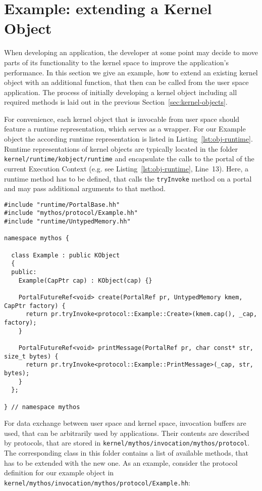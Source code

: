 \section{Example: extending a Kernel Object}
\label{sec:objects-example}

When developing an application, the developer at some point may decide to move
parts of its functionality to the kernel space to improve the application's
performance. In this section we give an example, how to extend an existing
kernel object with an additional function, that then can be called from the user space
application. The process of initially developing a kernel object including all
required methods is laid out in the previous Section~\ref{sec:kernel-objects}.

For convenience, each kernel object that is invocable from user space should
feature a runtime representation, which serves as a wrapper.  For our Example
object the according runtime representation is listed in
Listing~\ref{lst:obj-runtime}. Runtime representations of kernel objects are
typically located in the folder \texttt{kernel/runtime/kobject/runtime} and
encapsulate the calls to the portal of the current Execution Context (e.g. see
Listing~\ref{lst:obj-runtime}, Line~13). Here, a runtime method has to be
defined, that calls the \texttt{tryInvoke} method on a portal and may pass
additional arguments to that method.

\lstset{language=c++,caption=Object's Runtime Representation,label=lst:obj-runtime}
\begin{lstlisting}
#include "runtime/PortalBase.hh"
#include "mythos/protocol/Example.hh"
#include "runtime/UntypedMemory.hh"

namespace mythos {

  class Example : public KObject
  {
  public:
    Example(CapPtr cap) : KObject(cap) {}

    PortalFutureRef<void> create(PortalRef pr, UntypedMemory kmem, CapPtr factory) {
      return pr.tryInvoke<protocol::Example::Create>(kmem.cap(), _cap, factory);
    }

    PortalFutureRef<void> printMessage(PortalRef pr, char const* str, size_t bytes) {
      return pr.tryInvoke<protocol::Example::PrintMessage>(_cap, str, bytes);
    }
  };

} // namespace mythos
\end{lstlisting}

For data exchange between user space and kernel space, invocation buffers are
used, that can be arbitrarily used by applications. Their contents are
described by protocols, that are stored in
\texttt{kernel/mythos/invocation/mythos/protocol}. The corresponding class in
this folder contains a list of available methods, that has to be extended with
the new one. As an example, consider the protocol definition for our example object in
\texttt{kernel/mythos/invocation/mythos/protocol/Example.hh}:

